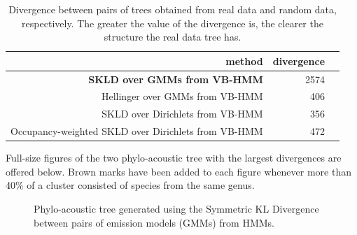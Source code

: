 \documentclass[pdftex,11pt,a4paper]{article}
\theoremstyle{definition}
\theoremstyle{remark}
\begin{document}
\begin{table}[t]
\begin{tabular}{r|r|r}
     \textbf{method} &\textbf{divergence}\\
     \hline
     \textbf{SKLD over GMMs from VB-HMM} & 2574\\
     Hellinger over GMMs from VB-HMM & 406\\
     SKLD over Dirichlets from VB-HMM & 356\\
     Occupancy-weighted SKLD over Dirichlets from VB-HMM & 472
\end{tabular} 
\caption{Divergence between pairs of trees obtained from real data and random data, respectively. The greater the value of the divergence is, the clearer the structure the real data tree has.} \label{tab1}
\end{table}

\par Full-size figures of the two phylo-acoustic tree with the largest divergences are offered below. Brown marks have been added to each figure whenever more than 40\% of a cluster consisted of species from the same genus.

\begin{figure}
\noindent{}
    \caption{Phylo-acoustic tree generated using the Symmetric KL Divergence between pairs of emission models (GMMs) from HMMs.}
    \label{fig:gmmskld}
\end{figure}
\end{document}
